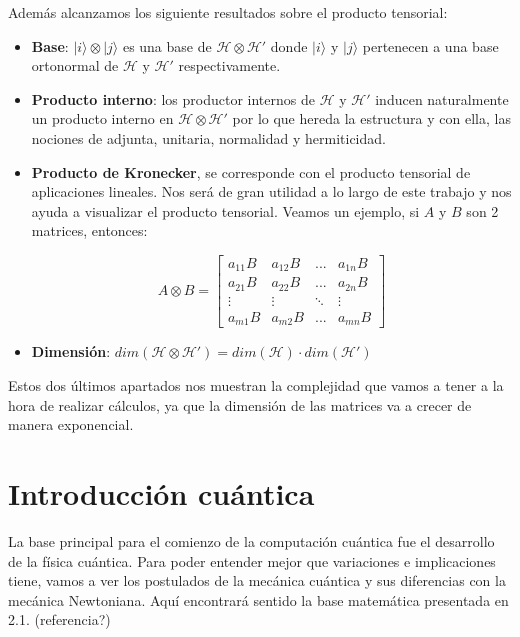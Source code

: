 Además alcanzamos los siguiente resultados sobre el producto tensorial:
\begin{itemize}
    \item \textbf{Base}: $|i\rangle \otimes |j\rangle$ es una base de $\mathscr{H} \otimes \mathscr{H}'$ donde $|i\rangle$ y $|j\rangle$ pertenecen a una base ortonormal de $\mathscr{H}$ y $\mathscr{H}'$ respectivamente. 
    
    \item \textbf{Producto interno}: los productor internos de $\mathscr{H}$ y $\mathscr{H}'$ inducen naturalmente un producto interno en $\mathscr{H} \otimes \mathscr{H}'$ por lo que hereda la estructura y con ella, las nociones de adjunta, unitaria, normalidad y hermiticidad.
    
    \item \textbf{Producto de Kronecker}, se corresponde con el producto tensorial de aplicaciones lineales. Nos será de gran utilidad a lo largo de este trabajo y nos ayuda a visualizar el producto tensorial. Veamos un ejemplo, si $A$ y $B$ son 2 matrices, entonces:\newline

        \begin{equation*}
        A\otimes B = \begin{bmatrix}
        a_{11}B & a_{12}B & ... & a_{1n}B\\
        a_{21}B & a_{22}B & ... & a_{2n}B\\
        \vdots & \vdots & \ddots & \vdots\\
        a_{m1}B & a_{m2}B & ... & a_{mn}B
        \end{bmatrix}
        \end{equation*}

    \vspace{5pt}
    \item \textbf{Dimensión}: $dim(\mathscr{H} \otimes \mathscr{H}')=dim(\mathscr{H})\cdot dim(\mathscr{H}')$
\end{itemize}

Estos dos últimos apartados nos muestran la complejidad que vamos a tener a la hora de realizar cálculos, ya que la dimensión de las matrices va a crecer de manera exponencial.

\newpage

\section{Introducción cuántica}
La base principal para el comienzo de la computación cuántica fue el desarrollo de la física cuántica. Para poder entender mejor que variaciones e implicaciones tiene, vamos a ver los postulados de la mecánica cuántica y sus diferencias con la mecánica Newtoniana. Aquí encontrará sentido la base matemática presentada en 2.1. (referencia?)

